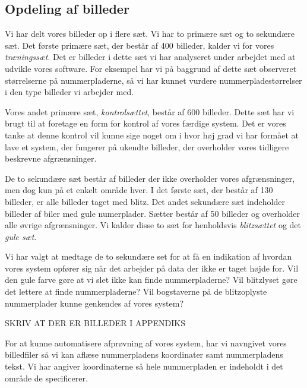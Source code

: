 \subsection{Opdeling af billeder}
Vi har delt vores billeder op i flere sæt. Vi har to primære sæt og to sekundære sæt. Det første primære sæt, der består af 400 billeder, kalder vi for vores \textit{træningssæt}. Det er billeder i dette sæt vi har analyseret under arbejdet med at udvikle vores software. For eksempel har vi på baggrund af dette sæt observeret størrelserne på nummerpladerne, så vi har kunnet vurdere nummerpladestørrelser i den type billeder vi arbejder med.

Vores andet primære sæt, \textit{kontrolsættet}, består af 600 billeder. Dette sæt har vi brugt til at foretage en form for kontrol af vores færdige system. Det er vores tanke at denne kontrol vil kunne sige noget om i hvor høj grad vi har formået at lave et system, der fungerer på ukendte billeder, der overholder vores tidligere beskrevne afgrænsninger. 

De to sekundære sæt består af billeder der ikke overholder vores afgrænsninger, men dog kun på et enkelt område hver. I det første sæt, der består af 130 billeder, er alle billeder taget med blitz. Det andet sekundære sæt indeholder billeder af biler med gule numerplader. Sætter består af 50 billeder og overholder alle øvrige afgrænsninger. Vi kalder disse to sæt for henholdsvis \textit{blitzsættet} og det \textit{gule sæt}.

Vi har valgt at medtage de to sekundære set for at få en indikation af hvordan vores system opfører sig når det arbejder på data der ikke er taget højde for. Vil den gule farve gøre at vi slet ikke kan finde nummerpladerne? Vil blitzlyset gøre det lettere at finde nummerpladerne? Vil bogstaverne på de blitzoplyste nummerplader kunne genkendes af vores system?

SKRIV AT DER ER BILLEDER I APPENDIKS

For at kunne automatisere afprøvning af vores system, har vi navngivet vores billedfiler så vi kan aflæse nummerpladens koordinater samt nummerpladens tekst. Vi har angiver koordinaterne så hele nummerpladen er indeholdt i det område de specificerer.